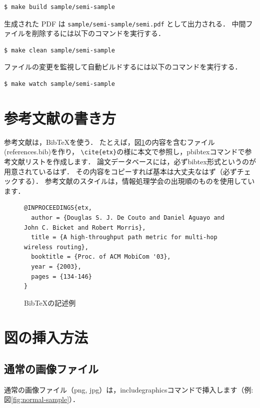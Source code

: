 \documentclass[submit,techreq,noauthor,dvipdfmx]{eco}
\begin{document}
\begin{lstlisting}
$ make build sample/semi-sample
\end{lstlisting}

生成された PDF は \texttt{sample/semi-sample/semi.pdf} として出力される．
中間ファイルを削除するには以下のコマンドを実行する．

\begin{lstlisting}
$ make clean sample/semi-sample
\end{lstlisting}

ファイルの変更を監視して自動ビルドするには以下のコマンドを実行する．

\begin{lstlisting}
$ make watch sample/semi-sample
\end{lstlisting}


\section{参考文献の書き方}
参考文献は，BibTeXを使う．
たとえば，図\ref{fig:bibsample}の内容を含むファイル(references.bib)を作り，
\verb|\cite{etx}|の様に本文で参照\cite{etx}し，pbibtexコマンドで参考文献リストを作成します．
論文データベースには，必ずbibtex形式というのが用意されているはず．
その内容をコピーすれば基本は大丈夫なはず（必ずチェックする）．
参考文献のスタイルは，情報処理学会の出現順のものを使用しています．

\begin{figure}[t]
	\begin{lstlisting}
@INPROCEEDINGS{etx,
  author = {Douglas S. J. De Couto and Daniel Aguayo and John C. Bicket and Robert Morris},
  title = {A high-throughput path metric for multi-hop wireless routing},
  booktitle = {Proc. of ACM MobiCom '03},
  year = {2003},
  pages = {134-146}
}
    \end{lstlisting}
	\vspace{-2mm}
	\caption{BibTeXの記述例}
	\label{fig:bibsample}
\end{figure}



\section{図の挿入方法}
\subsection{通常の画像ファイル}
通常の画像ファイル（png, jpg）は，includegraphicsコマンドで挿入します（例: 図\ref{fig:normal-sample}）．
\end{document}
